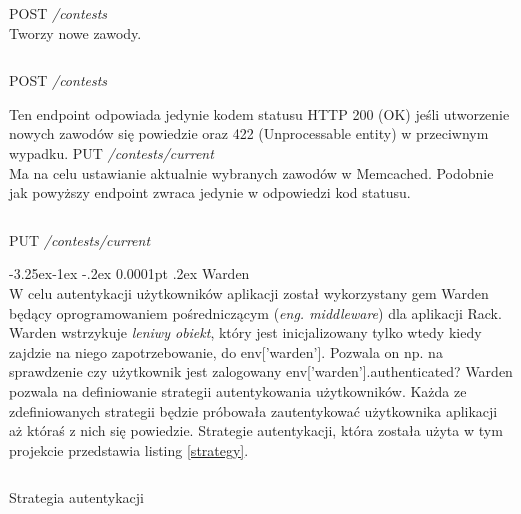 \documentclass[11pt,a4paper, twoside]{article}
\makeatletter
\renewcommand\paragraph{\@startsection{paragraph}{4}{\z@}%
                                     {-3.25ex\@plus -1ex \@minus -.2ex}%
                                     {0.0001pt \@plus .2ex}%
                                     {\normalfont\normalsize\bfseries}}
\makeatother
\begin{document}
\noindent
POST \emph{/contests}
\\
\noindent
Tworzy nowe zawody.
\begin{listing}[H]
\inputminted{ruby}{./src/contest_curl}
\caption{POST \emph{/contests}}
\end{listing}
\noindent
Ten endpoint odpowiada jedynie kodem statusu HTTP 200 (OK) jeśli utworzenie nowych zawodów się powiedzie oraz 422 (Unprocessable entity) w przeciwnym wypadku.
\newline
\newline
\noindent
PUT \emph{/contests/current}
\\
\noindent
Ma na celu ustawianie aktualnie wybranych zawodów w Memcached. Podobnie jak powyższy endpoint zwraca jedynie w odpowiedzi kod statusu.
\begin{listing}[H]
\inputminted{ruby}{./src/curl_current_contest}
\caption{PUT \emph{/contests/current}}
\end{listing}
\paragraph{Warden}\label{warden} ~\\
\indent W celu autentykacji użytkowników aplikacji został wykorzystany gem Warden będący oprogramowaniem pośredniczącym (\emph{eng. middleware}) dla aplikacji Rack. Warden wstrzykuje \emph{leniwy obiekt}, który jest inicjalizowany tylko wtedy kiedy zajdzie na niego zapotrzebowanie, do env['warden']. Pozwala on np. na sprawdzenie czy użytkownik jest zalogowany env['warden'].authenticated? Warden pozwala na definiowanie strategii autentykowania użytkowników. Każda ze zdefiniowanych strategii będzie próbowała zautentykować użytkownika aplikacji aż któraś z nich się powiedzie. Strategie autentykacji, która została użyta w tym projekcie przedstawia listing \ref{strategy}.

\begin{listing}[H]
\inputminted[linenos=true]{ruby}{./src/warden_strategy.rb}
\caption{Strategia autentykacji}
$\label{strategy}$
\end{listing}
\newpage
\end{document}
